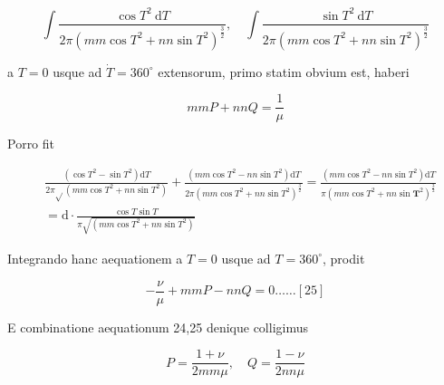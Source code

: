\documentclass[10pt]{article}
\begin{document}
\[
\int \frac{\cos T^{2} \mathrm{~d} T}{2 \pi\left(m m \cos T^{2}+n n \sin T^{2}\right)^{\frac{3}{2}}}, \quad \int \frac{\sin T^{2} \mathrm{~d} T}{2 \pi\left(m m \cos T^{2}+n n \sin T^{2}\right)^{\frac{3}{2}}}
\]

a \(T=0\) usque ad \(\dot{T}=360^{\circ}\) extensorum, primo statim obvium est, haberi

\[
m m P+n n Q=\frac{1}{\mu}
\]

Porro fit

\[
\begin{aligned}
& \frac{\left(\cos T^{2}-\sin T^{2}\right) \mathrm{d} T}{2 \pi \sqrt{ }\left(m m \cos T^{2}+n n \sin T^{2}\right)}+\frac{\left(m m \cos T^{2}-n n \sin T^{2}\right) \mathrm{d} T}{2 \pi\left(m m \cos T^{2}+n n \sin T^{2}\right)^{\frac{3}{2}}}=\frac{\left(m m \cos T^{2}-n n \sin T^{2}\right) \mathrm{d} T}{\pi\left(m m \cos T^{2}+n n \sin \boldsymbol{T}^{2}\right)^{\frac{3}{2}}} \\
& =\mathrm{d} \cdot \frac{\cos T \sin T}{\pi \sqrt{\left(m m \cos T^{2}+n n \sin T^{2}\right)}}
\end{aligned}
\]

Integrando hanc aequationem a \(T=0\) usque ad \(T=360^{\circ}\), prodit

\[
-\frac{\nu}{\mu}+m m P-n n Q=0 \ldots \ldots[25]
\]

E combinatione aequationum 24,25 denique colligimus

\[
P=\frac{1+\nu}{2 m m \mu}, \quad Q=\frac{1-\nu}{2 n n \mu}
\]
\end{document}
